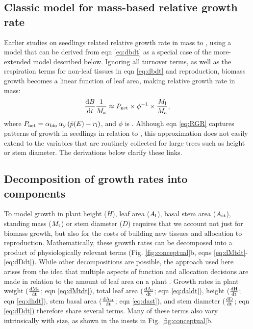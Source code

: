 \documentclass[9pt,twocolumn,twoside,lineno]{pnas-new}
\begin{document}
\subsection{Classic model for mass-based relative growth rate}

Earlier studies on seedlings related relative growth rate in mass to {\lma} \citep{Blackman-1919, Lambers-1992, Cornelissen-1996, Wright-2000}, using a model that can be derived from eqn \ref{eq:dbdt} as a special case of the more-extended model described below. Ignoring all turnover terms, as well as the respiration terms for non-leaf tissues in eqn \ref{eq:dbdt} and reproduction, biomass growth becomes a linear function of leaf area, making relative growth rate in mass:
\begin{equation}\label{eq:RGR}
\frac{{\rm d}B}{{\rm d}t}\frac{1}{M_{\rm a}}  \approx P_{\rm net} \times \phi^{-1} \times \frac{M_{\rm l}}{M_{\rm a}}, \end{equation}
where $P_{\rm net} = \alpha_{\rm bio} \, \alpha_{\rm y}\,(\bar{p}(E) - r_{\rm l})$, and $\phi$ is {\lma}. Although eqn \ref{eq:RGR} captures patterns of growth in seedlings in relation to {\lma} \citep{Wright-2000}, this approximation does not easily extend to the variables that are routinely collected for large trees such as height or stem diameter. The derivations below clarify these links.

\subsection{Decomposition of growth rates into components}

\setcounter{equation}{9}

To model growth in plant height ($H$), leaf area ($A_{\rm l}$), basal stem area ($ A_{\rm st}$), standing mass ($M_{\rm t}$) or stem diameter ($D$) requires that we account not just for biomass growth, but also for the costs of building new tissues and allocation to reproduction. Mathematically, these growth rates can be decomposed into a product of physiologically relevant terms \citep{Falster-2011, Gibert-2016} (Fig. \ref{fig:conceptual}b, eqns \ref{eq:dMtdt}-\ref{eq:dDdt}). While other decompositions are possible, the approach used here arises from the idea that multiple aspects of function and allocation decisions are made in relation to the amount of leaf area on a plant  \citep{Falster-2011}. Growth rates in plant weight ($\frac{\rm{d} M_{\rm t} }{\rm{d} t}$; eqn \ref{eq:dMtdt}), total leaf area ($\frac{\rm{d} A_{\rm l}}{\rm{d} t}$; eqn \ref{eq:daldt}), height ($\frac{\rm{d} H}{\rm{d} t}$; eqn \ref{eq:dhdt}), stem basal area ($\frac{\rm{d}  A_{\rm st}}{\rm{d} t}$; eqn \ref{eq:dast}), and stem diameter ($\frac{\rm{d} D}{\rm{d} t}$; eqn \ref{eq:dDdt}) therefore share several terms. Many of these terms also vary intrinsically with size, as shown in the insets in Fig. \ref{fig:conceptual}b.
\end{document}
